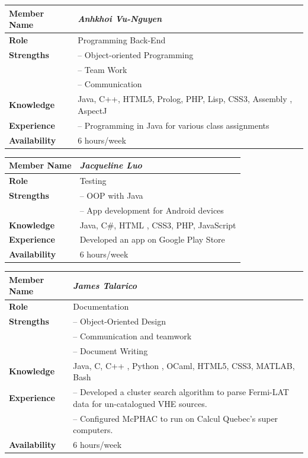 \documentclass[12pt]{article}
\begin{document}
%
\begin{center}
\begin{tabular}{ p{2.7cm} | p{9cm} }
\hline
\textbf{Member Name}	&	\textit{\textbf{Anhkhoi Vu-Nguyen}}	\\ \hline \hline
\textbf{Role}		&	Programming Back-End	\\ \hline
\textbf{Strengths}	&	-- Object-oriented Programming	\\
					&	-- Team Work	\\
					&	-- Communication	\\ \hline
\textbf{Knowledge}	&	Java, C++, HTML5, Prolog, PHP, Lisp, CSS3, Assembly , AspectJ	\\ \hline
\textbf{Experience}	&	-- Programming in Java for various class assignments 	\\ \hline
\textbf{Availability}	&	6 hours/week	\\ \hline
\end{tabular}
\end{center}
%
\vspace{3mm}
%
\begin{center}
\begin{tabular}{ p{2.7cm} | p{9cm} }
\hline
\textbf{Member Name}	&	\textit{\textbf{Jacqueline Luo}}	\\ \hline \hline
\textbf{Role}		&	Testing	\\ \hline
\textbf{Strengths}	&	-- OOP with Java	\\
					&	-- App development for Android devices	\\ \hline
\textbf{Knowledge}	&	Java, C\#, HTML , CSS3, PHP, JavaScript	\\ \hline
\textbf{Experience}	&	Developed an app on Google Play Store	\\ \hline
\textbf{Availability}	&	6 hours/week	\\ \hline
\end{tabular}
\end{center}
%
\vspace{3mm}
%
\begin{center}
\begin{tabular}{ p{2.7cm} | p{9cm} }
\hline
\textbf{Member Name}	&	\textit{\textbf{James Talarico}}	\\ \hline \hline
\textbf{Role}		&	Documentation	\\ \hline
\textbf{Strengths}	&	-- Object-Oriented Design	\\
					&	-- Communication and teamwork	\\
					&	-- Document Writing	\\ \hline
\textbf{Knowledge}	&	Java, C, C++ , Python , OCaml, HTML5, CSS3, MATLAB, Bash	\\ \hline
\textbf{Experience}	&	-- Developed a cluster search algorithm to parse Fermi-LAT data for un-catalogued VHE sources.	\\
					&	-- Configured McPHAC to run on Calcul Quebec's super computers.	\\ \hline
\textbf{Availability}	&	6 hours/week	\\ \hline
\end{tabular}
\end{center}
\end{document}
